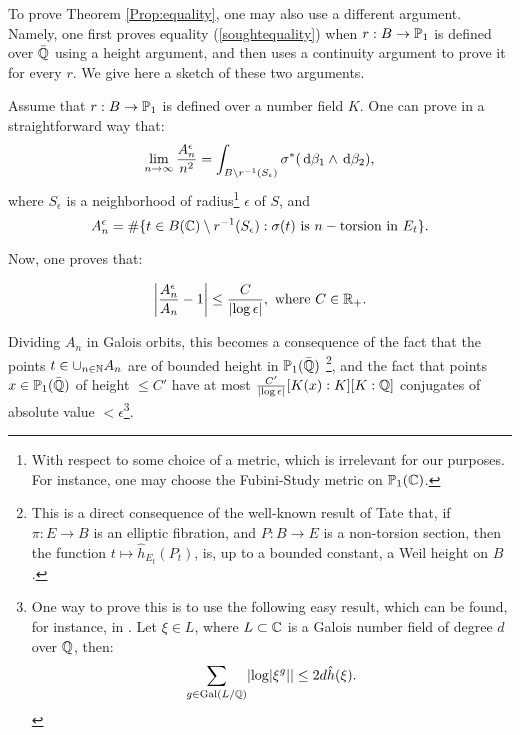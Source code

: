 \documentclass[a4paper,12pt]{article}
\theoremstyle{remark}
\begin{document}
\begin{remark}
	To prove Theorem \ref{Prop:equality}, one may also use a different argument. Namely, one first proves equality (\ref{soughtequality}) when $r:B \rightarrow \P_1$ is defined over $\bar{\Q}$ using a height argument, and then uses a continuity argument to prove it for every $r$. We give here a sketch of these two arguments. 
	
	
	
	Assume that $r:B \rightarrow \P_1$ is defined over a number field $K$. One can prove in a straightforward way that: 
	\begin{equation}\label{Eq:approxsoughtequality}
	\lim_{n \to \infty}\frac{A^{\epsilon}_n}{n^2}=\int_{B \setminus r^{-1}(S_{\epsilon})} \sigma^*(\de \beta_1 \wedge \de \beta_2),
	\end{equation}
	where $S_{\epsilon}$ is a neighborhood of radius\footnote{With respect to some choice of a metric, which is irrelevant for our purposes. For instance, one may choose the Fubini-Study metric on $\P_1(\C)$.} $\epsilon$ of $S$, and 
	\[
	A^{\epsilon}_n=\# \{t \in B(\C)\setminus r^{-1}(S_{\epsilon}): \sigma(t) \text{ is }n-\text{torsion in } E_t\}.
	\]
	
	Now, one proves that:
	
	\begin{equation}\label{Bound:Uniform}
		\left| \frac{A^{\epsilon}_n}{A_n}-1 \right|\leq \frac{C}{\abs{\log \epsilon}}, \text{ where } C \in \R_+.
	\end{equation}
	
	
	Dividing $A_n$ in Galois orbits, this becomes a consequence of the fact that the points $t \in \cup_{n \in \N}A_n$ are of bounded height in $\P_1(\bar{\Q})$ \footnote{This is a direct consequence of the well-known result of Tate \cite{Tate} that, if $\pi:E\rightarrow B$ is an elliptic fibration, and $P:B \rightarrow E$ is a non-torsion section, then the function $t \mapsto \hat{h}_{E_t}(P_t)$, is, up to a bounded constant, a Weil height on $B$.}, 
	and the fact that points $x \in \P_1(\bar{\Q})$ of height $\leq C'$ have at most $\frac{C'}{\abs{\log \epsilon}}[K(x):K][K:\Q]$ conjugates of absolute value $< \epsilon$\footnote{One way to prove this is to use the following easy result, which can be found, for instance, in \cite[Remark 3.10(ii)]{LectureNotesZannier}. Let $\xi \in L$, where $L\subset \C$ is a Galois number field of degree $d$ over $\Q$, then:
	\[
	\sum_{g \in \Gal(L/\Q)}\abs{\log\abs{\xi^g}}\leq 2d\hat{h}(\xi).
	\]}.
	

\end{remark}
\end{document}

